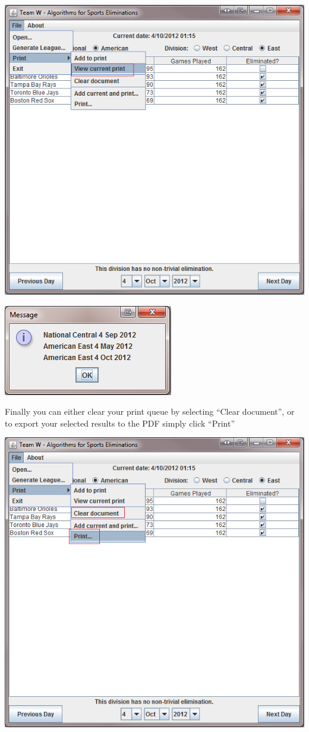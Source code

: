 \includegraphics[width=\linewidth,height=\measurepage,keepaspectratio]{images/userManualDesk11.png}

\includegraphics{images/userManualDesk12.png}

\newpage

Finally you can either clear your print queue by selecting ``Clear document'', or
to export your selected results to the PDF simply click ``Print''

\includegraphics[width=\linewidth,height=\measurepage,keepaspectratio]
{images/userManualDesk13.png}

